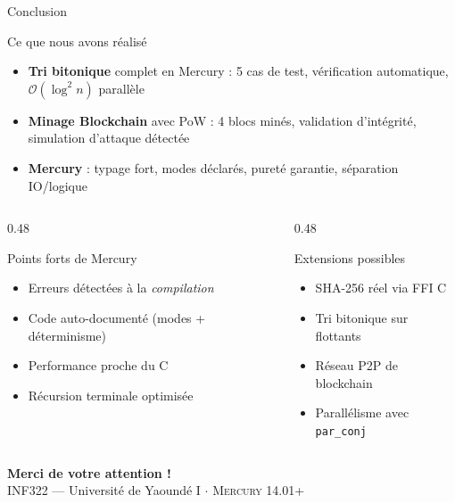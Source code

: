 \documentclass[aspectratio=169,12pt]{beamer}
\newcommand{\mercury}{\textsc{Mercury}}
\newcommand{\Oh}[1]{\mathcal{O}\!\left(#1\right)}
\newcommand{\code}[1]{\texttt{\color{KeywordColor}#1}}
\begin{document}
\begin{frame}{\faFlagCheckered\quad Conclusion}
  \begin{block}{Ce que nous avons réalisé}
    \begin{itemize}
      \item[\faCheckCircle] \textbf{Tri bitonique} complet en Mercury :
        5 cas de test, vérification automatique, $\Oh{\log^2 n}$ parallèle
      \item[\faCheckCircle] \textbf{Minage Blockchain} avec PoW :
        4 blocs minés, validation d'intégrité, simulation d'attaque détectée
      \item[\faCheckCircle] \textbf{Mercury} : typage fort, modes déclarés,
        pureté garantie, séparation IO/logique
    \end{itemize}
  \end{block}

  \vspace{0.4em}
  \begin{columns}[T]
    \begin{column}{0.48\textwidth}
      \begin{exampleblock}{Points forts de Mercury}
        \begin{itemize}
          \item Erreurs détectées à la \emph{compilation}
          \item Code auto-documenté (modes + déterminisme)
          \item Performance proche du C
          \item Récursion terminale optimisée
        \end{itemize}
      \end{exampleblock}
    \end{column}
    \begin{column}{0.48\textwidth}
      \begin{alertblock}{Extensions possibles}
        \begin{itemize}
          \item SHA-256 réel via FFI C
          \item Tri bitonique sur flottants
          \item Réseau P2P de blockchain
          \item Parallélisme avec \code{par\_conj}
        \end{itemize}
      \end{alertblock}
    \end{column}
  \end{columns}

  \vspace{0.6em}
  \begin{center}
    \large\color{MercuryBlue}
    \textbf{\faCode\quad Merci de votre attention !}\\[0.3em]
    \normalsize\color{gray}
    INF322 — Université de Yaoundé I
    \quad$\cdot$\quad
    \mercury{} 14.01+
  \end{center}
\end{frame}
\end{document}
